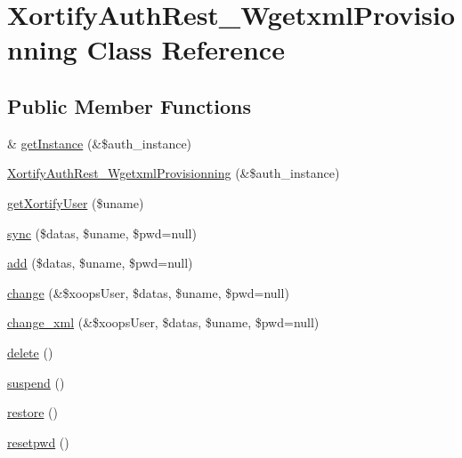 \hypertarget{class_xortify_auth_rest___wgetxml_provisionning}{\section{Xortify\-Auth\-Rest\-\_\-\-Wgetxml\-Provisionning Class Reference}
\label{class_xortify_auth_rest___wgetxml_provisionning}
}
\subsection*{Public Member Functions}
\begin{DoxyCompactItemize}
\item 
\& \hyperlink{class_xortify_auth_rest___wgetxml_provisionning_a2c8eaa915c70d75289ac8a03686194f9}{get\-Instance} (\&\$auth\-\_\-instance)
\item 
\hyperlink{class_xortify_auth_rest___wgetxml_provisionning_af423120961930c8e60cca3d8db6ab8fe}{Xortify\-Auth\-Rest\-\_\-\-Wgetxml\-Provisionning} (\&\$auth\-\_\-instance)
\item 
\hyperlink{class_xortify_auth_rest___wgetxml_provisionning_a041d726ac26672547ed1504e8e0117aa}{get\-Xortify\-User} (\$uname)
\item 
\hyperlink{class_xortify_auth_rest___wgetxml_provisionning_a35dc08b0f2138eb818ff95345b73bcff}{sync} (\$datas, \$uname, \$pwd=null)
\item 
\hyperlink{class_xortify_auth_rest___wgetxml_provisionning_adfc9fcef01e7bd7b2f47e8e79d51fc63}{add} (\$datas, \$uname, \$pwd=null)
\item 
\hyperlink{class_xortify_auth_rest___wgetxml_provisionning_ae1f0971b9712c794620cf309164e43af}{change} (\&\$xoops\-User, \$datas, \$uname, \$pwd=null)
\item 
\hyperlink{class_xortify_auth_rest___wgetxml_provisionning_ab594a8b13e8777f281050b8e348be6c2}{change\-\_\-xml} (\&\$xoops\-User, \$datas, \$uname, \$pwd=null)
\item 
\hyperlink{class_xortify_auth_rest___wgetxml_provisionning_a13bdffdd926f26b825ea57066334ff01}{delete} ()
\item 
\hyperlink{class_xortify_auth_rest___wgetxml_provisionning_ad73006a505121228f3b075c2409787d2}{suspend} ()
\item 
\hyperlink{class_xortify_auth_rest___wgetxml_provisionning_aa1371f22826cf8cde4454c9b467203d0}{restore} ()
\item 
\hyperlink{class_xortify_auth_rest___wgetxml_provisionning_a06d70fbd3a2db390b6f2530c0076628e}{resetpwd} ()
\end{DoxyCompactItemize}
